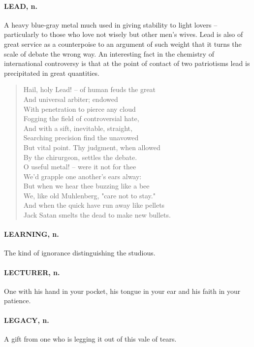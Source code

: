 \documentclass[11pt]{article}
\begin{document}
\paragraph{LEAD, n.}  A heavy blue-gray metal much used in giving stability to
light lovers -- particularly to those who love not wisely but other
men's wives.  Lead is also of great service as a counterpoise to an
argument of such weight that it turns the scale of debate the wrong
way.  An interesting fact in the chemistry of international
controversy is that at the point of contact of two patriotisms lead is
precipitated in great quantities.

\begin{quote}   Hail, holy Lead! -- of human feuds the great \\
      And universal arbiter; endowed \\
      With penetration to pierce any cloud \\
  Fogging the field of controversial hate, \\
  And with a sift, inevitable, straight, \\
      Searching precision find the unavowed \\
      But vital point.  Thy judgment, when allowed \\
  By the chirurgeon, settles the debate. \\
  O useful metal! -- were it not for thee \\
      We'd grapple one another's ears alway: \\
  But when we hear thee buzzing like a bee \\
      We, like old Muhlenberg, "care not to stay." \\
  And when the quick have run away like pellets \\
  Jack Satan smelts the dead to make new bullets.  \end{quote}

\paragraph{LEARNING, n.}  The kind of ignorance distinguishing the studious.

\paragraph{LECTURER, n.}  One with his hand in your pocket, his tongue in your ear
and his faith in your patience.

\paragraph{LEGACY, n.}  A gift from one who is legging it out of this vale of
tears.
\end{document}
